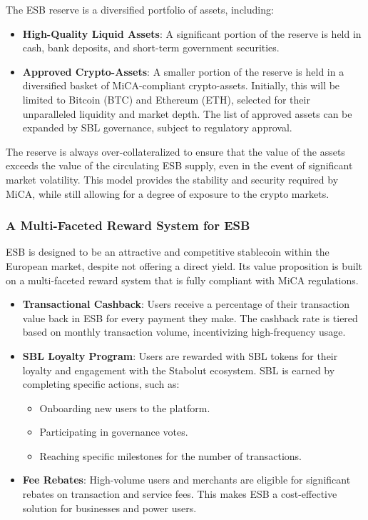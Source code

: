 The ESB reserve is a diversified portfolio of assets, including:
\begin{itemize}
    \item \textbf{High-Quality Liquid Assets}: A significant portion of the reserve is held in cash, bank deposits, and short-term government securities.
    \item \textbf{Approved Crypto-Assets}: A smaller portion of the reserve is held in a diversified basket of MiCA-compliant crypto-assets. Initially, this will be limited to Bitcoin (BTC) and Ethereum (ETH), selected for their unparalleled liquidity and market depth. The list of approved assets can be expanded by SBL governance, subject to regulatory approval.
\end{itemize}

The reserve is always over-collateralized to ensure that the value of the assets exceeds the value of the circulating ESB supply, even in the event of significant market volatility. This model provides the stability and security required by MiCA, while still allowing for a degree of exposure to the crypto markets.

\subsubsection{A Multi-Faceted Reward System for ESB}
ESB is designed to be an attractive and competitive stablecoin within the European market, despite not offering a direct yield. Its value proposition is built on a multi-faceted reward system that is fully compliant with MiCA regulations.

\begin{itemize}
    \item \textbf{Transactional Cashback}: Users receive a percentage of their transaction value back in ESB for every payment they make. The cashback rate is tiered based on monthly transaction volume, incentivizing high-frequency usage.
    \item \textbf{SBL Loyalty Program}: Users are rewarded with SBL tokens for their loyalty and engagement with the Stabolut ecosystem. SBL is earned by completing specific actions, such as:
    \begin{itemize}
        \item Onboarding new users to the platform.
        \item Participating in governance votes.
        \item Reaching specific milestones for the number of transactions.
    \end{itemize}
    \item \textbf{Fee Rebates}: High-volume users and merchants are eligible for significant rebates on transaction and service fees. This makes ESB a cost-effective solution for businesses and power users.
\end{itemize}

